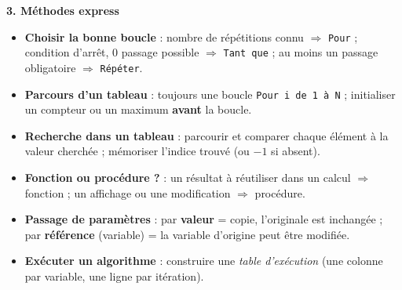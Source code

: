 \documentclass[11pt]{article}
\begin{document}
\begin{bilan}
\textbf{3. Méthodes express}
\begin{itemize}
  \item \textbf{Choisir la bonne boucle} : nombre de répétitions connu $\Rightarrow$ \texttt{Pour} ; condition d'arrêt, 0 passage possible $\Rightarrow$ \texttt{Tant que} ; au moins un passage obligatoire $\Rightarrow$ \texttt{Répéter}.
  \item \textbf{Parcours d'un tableau} : toujours une boucle \texttt{Pour i de 1 à N} ; initialiser un compteur ou un maximum \textbf{avant} la boucle.
  \item \textbf{Recherche dans un tableau} : parcourir et comparer chaque élément à la valeur cherchée ; mémoriser l'indice trouvé (ou $-1$ si absent).
  \item \textbf{Fonction ou procédure ?} : un résultat à réutiliser dans un calcul $\Rightarrow$ fonction ; un affichage ou une modification $\Rightarrow$ procédure.
  \item \textbf{Passage de paramètres} : par \textbf{valeur} = copie, l'originale est inchangée ; par \textbf{référence} (variable) = la variable d'origine peut être modifiée.
  \item \textbf{Exécuter un algorithme} : construire une \emph{table d'exécution} (une colonne par variable, une ligne par itération).
\end{itemize}
\end{bilan}
\end{document}
